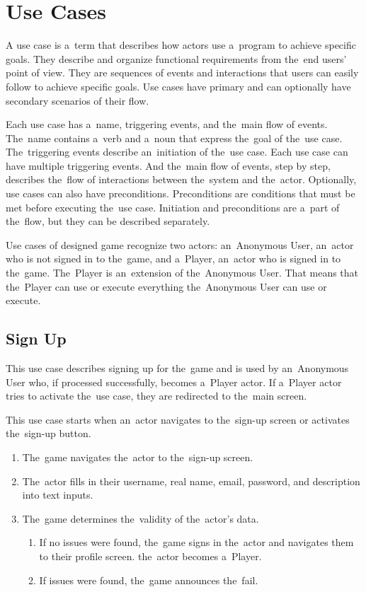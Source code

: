 \section{Use Cases}

A use case is a~term that describes how actors use a~program to achieve specific goals.
They describe and organize functional requirements from the~end users' point of view.
They are sequences of events and interactions that users can easily follow to achieve specific goals.
Use cases have primary and can optionally have secondary scenarios of their flow.

Each use case has a~name, triggering events, and the~main flow of events.
The~name contains a~verb and a~noun that express the~goal of the~use case.
The~triggering events describe an~initiation of the~use case.
Each use case can have multiple triggering events.
And the~main flow of events, step by step, describes the~flow of interactions between the~system and the~actor.
Optionally, use cases can also have preconditions.
Preconditions are conditions that must be met before executing the~use case.
Initiation and preconditions are a~part of the~flow, but they can be described separately.

Use cases of designed game recognize two actors: an~Anonymous User, an~actor who is not signed in to the~game, and a~Player, an~actor who is signed in to the~game.
The~Player is an~extension of the~Anonymous User.
That means that the~Player can use or execute everything the~Anonymous User can use or execute.

\let\oldsubsection=\thesubsection
\renewcommand\thesubsection{UC\arabic{subsection}}

\pagebreak
\subsection{Sign Up}

This use case describes signing up for the~game and is used by an~Anonymous User who, if processed successfully, becomes a~Player actor. If a~Player actor tries to activate the~use case, they are redirected to the~main screen.

This use case starts when an~actor navigates to the~sign-up screen or activates the~sign-up button.

\begin{enumerate}
    \item The~game navigates the~actor to the~sign-up screen.
    \item The~actor fills in their username, real name, email, password, and description into text inputs.
    \item The~game determines the~validity of the~actor's data.
    \begin{enumerate}
        \item If no issues were found, the~game signs in the~actor and navigates them to their profile screen.
        the~actor becomes a~Player.
        \item If issues were found, the~game announces the~fail.
    \end{enumerate}
\end{enumerate}

